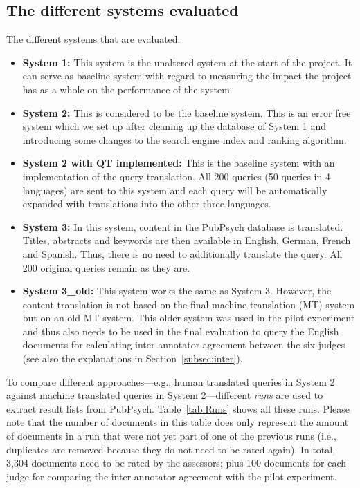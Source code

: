 \documentclass[a4paper,11pt]{article}
\begin{document}
\subsection{The different systems evaluated}
The different systems that are evaluated:
\begin{itemize}
    \item \textbf{System 1:} This system is the unaltered system at the start of the project. It can serve as baseline system with regard to measuring the impact the project has as a whole on the performance of the system.
    \item \textbf{System 2:} This is considered to be the baseline system. This is an error free system which we set up after cleaning up the database of System 1 and introducing some changes to the search engine index and ranking algorithm.
    \item \textbf{System 2 with QT implemented:} This is the baseline system with an implementation of the query translation. All 200 queries (50 queries in 4 languages) are sent to this system and each query will be automatically expanded with translations into the other three languages.
    \item \textbf{System 3:} In this system, content in the PubPsych database is translated. Titles, abstracts and keywords are then available in English, German, French and Spanish. Thus, there is no need to additionally translate the query. All 200 original queries remain as they are.
    \item \textbf{System 3\_old:} This system works the same as System 3. However, the content translation is not based on the final machine translation (MT) system but on an old MT system. This older system was used in the pilot experiment and thus also needs to be used in the final evaluation to query the English documents for calculating inter-annotator agreement between the six judges (see also the explanations in Section~\ref{subsec:inter}).
\end{itemize}

To compare different approaches---e.g., human translated queries in System 2 against machine translated queries in System 2---different \textit{runs} are used to extract result lists from PubPsych. Table~\ref{tab:Runs} shows all these runs. Please note that the number of documents in this table does only represent the amount of documents in a run that were not yet part of one of the previous runs (i.e., duplicates are removed because they do not need to be rated again). In total, 3,304 documents need to be rated by the assessors; plus 100 documents for each judge for comparing the inter-annotator agreement with the pilot experiment.
\end{document}
